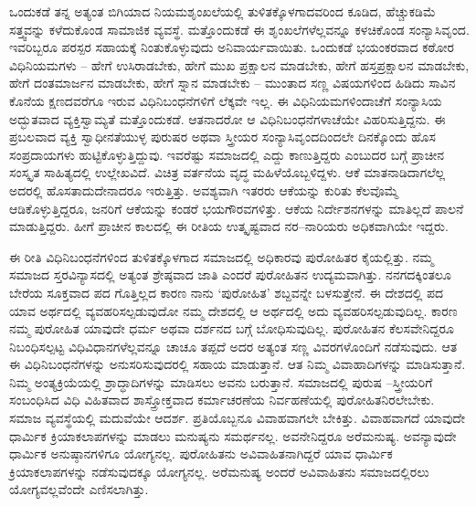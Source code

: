ಒಂದುಕಡೆ ತನ್ನ ಅತ್ಯಂತ ಬಿಗಿಯಾದ ನಿಯಮಶೃಂಖಲೆಯಲ್ಲಿ ತುಳಿತಕ್ಕೊಳಗಾದವರಿಂದ ಕೂಡಿದ, ಹೆಚ್ಚುಕಡಿಮೆ ಸತ್ತ್ವವನ್ನು ಕಳೆದುಕೊಂಡ ಸಾಮಾಜಿಕ ವ್ಯವಸ್ಥೆ. ಮತ್ತೊಂದುಕಡೆ ಈ ಶೃಂಖಲೆಗಳೆಲ್ಲವನ್ನೂ ಕಳಚಿಕೊಂಡ ಸಂನ್ಯಾಸಿವೃಂದ. ಇವರಿಬ್ಬರೂ ಪರಸ್ಪರ ಸಹಾಯಕ್ಕೆ ನಿಂತುಕೊಳ್ಳುವುದು ಅನಿವಾರ್ಯವಾಯಿತು. ಒಂದುಕಡೆ ಭಯಂಕರವಾದ ಕಠೋರ ವಿಧಿನಿಯಮಗಳು – ಹೇಗೆ ಉಸಿರಾಡಬೇಕು, ಹೇಗೆ ಮುಖ ಪ್ರಕ್ಷಾಲನ ಮಾಡಬೇಕು, ಹೇಗೆ ಹಸ್ತಪ್ರಕ್ಷಾಲನ ಮಾಡಬೇಕು, ಹೇಗೆ ದಂತಮಾರ್ಜನ ಮಾಡಬೇಕು, ಹೇಗೆ ಸ್ನಾನ ಮಾಡಬೇಕು – ಮುಂತಾದ ಸಣ್ಣ ವಿಷಯಗಳಿಂದ ಹಿಡಿದು ಸಾವಿನ ಕೊನೆಯ ಕ್ಷಣದವರೆಗೂ ಇರುವ ವಿಧಿನಿಬಂಧನೆಗಳಿಗೆ ಲೆಕ್ಕವೇ ಇಲ್ಲ. ಈ ವಿಧಿನಿಯಮಗಳಿಂದಾಚೆಗೆ ಸಂನ್ಯಾಸಿಯ ಅದ್ಭುತವಾದ ವ್ಯಕ್ತಿಸ್ವಾಮ್ಯತೆ ಮತ್ತೊಂದುಕಡೆ. ಆತನಾದರೋ ಆ ವಿಧಿನಿಬಂಧನೆಗಳಾಚೆಯೇ ವಿಹರಿಸುತ್ತಿದ್ದನು. ಈ ಪ್ರಬಲವಾದ ವ್ಯಕ್ತಿ ಸ್ವಾಧೀನತೆಯುಳ್ಳ ಪುರುಷರ ಅಥವಾ ಸ್ತ್ರೀಯರ ಸಂನ್ಯಾಸಿವೃಂದದಿಂದಲೇ ದಿನಕ್ಕೊಂದು ಹೊಸ ಸಂಪ್ರದಾಯಗಳು ಹುಟ್ಟಿಕೊಳ್ಳುತ್ತಿದ್ದುವು. ಇವರೆಷ್ಟು ಸಮಾಜದಲ್ಲಿ ಎದ್ದು ಕಾಣುತ್ತಿದ್ದರು ಎಂಬುದರ ಬಗ್ಗೆ ಪ್ರಾಚೀನ ಸಂಸ್ಕೃತ ಸಾಹಿತ್ಯದಲ್ಲಿ ಉಲ್ಲೇಖವಿದೆ. ವಿಚಿತ್ರ ವರ್ತನೆಯ ವೃದ್ಧ ಮಹಿಳೆಯೊಬ್ಬಳಿದ್ದಳು. ಆಕೆ ಮಾತನಾಡಿದಾಗಲೆಲ್ಲ ಅದರಲ್ಲಿ ಹೊಸತಾದುದೇನಾದರೂ ಇರುತ್ತಿತ್ತು. ಅವಶ್ಯವಾಗಿ ಇತರರು ಆಕೆಯನ್ನು ಕುರಿತು ಕೆಲವೊಮ್ಮೆ ಆಡಿಕೊಳ್ಳುತ್ತಿದ್ದರೂ, ಜನರಿಗೆ ಆಕೆಯನ್ನು ಕಂಡರೆ ಭಯಗೌರವಗಳಿತ್ತು. ಆಕೆಯ ನಿರ್ದೇಶನಗಳನ್ನು ಮಾತಿಲ್ಲದೆ ಪಾಲನೆ ಮಾಡುತ್ತಿದ್ದರು. ಹೀಗೆ ಪ್ರಾಚೀನ ಕಾಲದಲ್ಲಿ ಈ ರೀತಿಯ ಉತ್ಕೃಷ್ಟವಾದ ನರ–ನಾರಿಯರು ಅಧಿಕವಾಗಿಯೇ ಇದ್ದರು.

ಈ ರೀತಿ ವಿಧಿನಿಬಂಧನೆಗಳಿಂದ ತುಳಿತಕ್ಕೊಳಗಾದ ಸಮಾಜದಲ್ಲಿ ಅಧಿಕಾರವು ಪುರೋಹಿತರ ಕೈಯಲ್ಲಿತ್ತು. ನಮ್ಮ ಸಮಾಜದ ಸ್ತರವಿನ್ಯಾಸದಲ್ಲಿ ಅತ್ಯಂತ ಶ್ರೇಷ್ಠವಾದ ಜಾತಿ ಎಂದರೆ ಪುರೋಹಿತನ ಉದ್ಯಮವಾಗಿತ್ತು. ನನಗದಕ್ಕಿಂತಲೂ ಬೇರೆಯ ಸೂಕ್ತವಾದ ಪದ ಗೊತ್ತಿಲ್ಲದ ಕಾರಣ ನಾನು ‘ಪುರೋಹಿತ’ ಶಬ್ದವನ್ನೇ ಬಳಸುತ್ತೇನೆ. ಈ ದೇಶದಲ್ಲಿ  ಪದ ಯಾವ ಅರ್ಥದಲ್ಲಿ ವ್ಯವಹರಿಸಲ್ಪಡುವುದೋ ನಮ್ಮ ದೇಶದಲ್ಲಿ ಆ ಅರ್ಥದಲ್ಲಿ ಅದು ವ್ಯವಹರಿಸಲ್ಪಡುವುದಿಲ್ಲ. ಕಾರಣ ನಮ್ಮ ಪುರೋಹಿತ ಯಾವುದೇ ಧರ್ಮ ಅಥವಾ ದರ್ಶನದ ಬಗ್ಗೆ ಬೋಧಿಸುವುದಿಲ್ಲ. ಪುರೋಹಿತನ ಕೆಲಸವೇನಿದ್ದರೂ ನಿಬಂಧಿಸಲ್ಪಟ್ಟ ವಿಧಿವಿಧಾನಗಳೆಲ್ಲವನ್ನೂ ಚಾಚೂ ತಪ್ಪದೆ ಅದರ ಅತ್ಯಂತ ಸಣ್ಣ ವಿವರಗಳೊಂದಿಗೆ ನಡೆಸುವುದು. ಆತ ಈ ವಿಧಿನಿಬಂಧನೆಗಳನ್ನು ಅನುಸರಿಸುವುದರಲ್ಲಿ ಸಹಾಯ ಮಾಡುತ್ತಾನೆ. ಆತ ನಿಮ್ಮ ವಿವಾಹಾದಿಗಳನ್ನು ಮಾಡಿಸುತ್ತಾನೆ. ನಿಮ್ಮ ಅಂತ್ಯಕ್ರಿಯೆಯಲ್ಲಿ ಶ್ರಾದ್ಧಾದಿಗಳನ್ನು ಮಾಡಿಸಲು ಅವನು ಬರುತ್ತಾನೆ. ಸಮಾಜದಲ್ಲಿ ಪುರುಷ –ಸ್ತ್ರೀಯರಿಗೆ ಸಂಬಂಧಿಸಿದ ವಿಧಿ ವಿಹಿತವಾದ ಶಾಸ್ತ್ರೋಕ್ತವಾದ ಕರ್ಮಾಚರಣೆಯ ನಿರ್ವಹಣೆಯಲ್ಲಿ ಪುರೋಹಿತನಿರಲೇಬೇಕು. ಸಮಾಜ ವ್ಯವಸ್ಥೆಯಲ್ಲಿ ಮದುವೆಯೇ ಆದರ್ಶ. ಪ್ರತಿಯೊಬ್ಬನೂ ವಿವಾಹವಾಗಲೇ ಬೇಕಿತ್ತು. ವಿವಾಹವಾಗದೆ ಯಾವುದೇ ಧಾರ್ಮಿಕ ಕ್ರಿಯಾಕಲಾಪಗಳನ್ನು ಮಾಡಲು ಮನುಷ್ಯನು ಸಮರ್ಥನಲ್ಲ. ಅವನೇನಿದ್ದರೂ ಅರೆಮನುಷ್ಯ. ಅವನ್ಯಾವುದೇ ಧಾರ್ಮಿಕ ಅನುಷ್ಠಾನಗಳಿಗೂ ಯೋಗ್ಯನಲ್ಲ. ಪುರೋಹಿತನು ಅವಿವಾಹಿತನಾಗಿದ್ದರೆ ಯಾವ ಧಾರ್ಮಿಕ ಕ್ರಿಯಾಕಲಾಪಗಳನ್ನು ನಡೆಸುವುದಕ್ಕೂ ಯೋಗ್ಯನಲ್ಲ. ಅರೆಮನುಷ್ಯ ಅಂದರೆ ಅವಿವಾಹಿತನು ಸಮಾಜದಲ್ಲಿರಲು ಯೋಗ್ಯವಲ್ಲವೆಂದೇ ಎಣಿಸಲಾಗಿತ್ತು.

